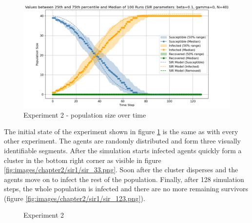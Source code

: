 \begin{figure}[H]
    \centering
    \includegraphics[width=1.0\textwidth]{images/chapter2/experiment2.png}
    \caption{Experiment 2 - population size over time}\label{fig:images/chapter2/experiment2.png}
\end{figure}

The initial state of the experiment shown in figure \ref{fig:images/chapter2/experiment2.png} is the same as with every other experiment.
The agents are randomly distributed and form three visually identifiable segments.
After the simulation starts infected agents quickly form a cluster in the bottom right corner as visible in figure \ref{fig:images/chapter2/sir1/sir_33.png}.
Soon after the cluster disperses and the agents move on to infect the rest of the population.
Finally, after 128 simulation steps, the whole population is infected and there are no more remaining survivors (figure \ref{fig:images/chapter2/sir1/sir_123.png}).

\begin{figure}[H]
    \centering
    \hspace*{\fill}
    \hspace*{\fill}

    \caption{Experiment 2} \label{fig:experiment1}
\end{figure}


